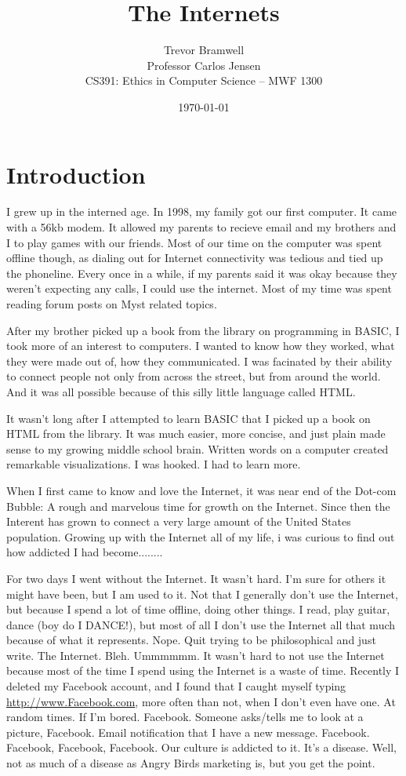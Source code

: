 \documentclass[12pt,letterpaper]{article}
\title{The Internets}
\author{
    Trevor Bramwell\\
    Professor Carlos Jensen\\
    CS391: Ethics in Computer Science -- MWF 1300\\
}
\date{\today}
\begin{document}
\maketitle

\section{Introduction}
I grew up in the interned age. In 1998, my family got our first
computer. It came with a 56kb modem. It allowed my parents to recieve
email and my brothers and I to play games with our friends. Most of our
time on the computer was spent offline though, as dialing out for
Internet connectivity was tedious and tied up the phoneline. Every once
in a while, if my parents said it was okay because they weren't
expecting any calls, I could use the internet. Most of my time was
spent reading forum posts on Myst related topics.

After my brother picked up a book from the library on programming in
BASIC, I took more of an interest to computers. I wanted to know how
they worked, what they were made out of, how they communicated. I was
facinated by their ability to connect people not only from across the
street, but from around the world. And it was all possible because of
this silly little language called HTML. 

It wasn't long after I attempted to learn BASIC that I picked up a book
on HTML from the library. It was much easier, more concise, and just
plain made sense to my growing middle school brain. Written words on a
computer created remarkable visualizations. I was hooked. I had to learn
more.

When I first came to know and love the Internet, it was near end of the
Dot-com Bubble: A rough and marvelous time for growth on the Internet.
Since then the Interent has grown to connect a very large amount of the
United States population. Growing up with the Internet all of my life,
i was curious to find out how addicted I had become........




For two days I went
without the Internet. It wasn't hard. I'm sure for others it might have
been, but I am used to it. Not that I generally don't use the Internet,
but because I spend a lot of time offline, doing other things. I read,
play guitar, dance (boy do I DANCE!), but most of all I don't use the
Internet all that much because of what it represents. Nope. Quit trying
to be philosophical and just write. The Internet. Bleh. Ummmmmm. It
wasn't hard to not use the Internet because most of the time I spend
using the Internet is a waste of time. Recently I deleted my Facebook
account, and I found that I caught myself typing \url{http://www.Facebook.com}, more
often than not, when I don't even have one. At random times. If I'm
bored. Facebook. Someone asks/tells me to look at a picture, Facebook.
Email notification that I have a new message. Facebook. Facebook,
Facebook, Facebook. Our culture is addicted to it. It's a disease. Well,
not as much of a disease as Angry Birds marketing is, but you get the
point.
\end{document}
